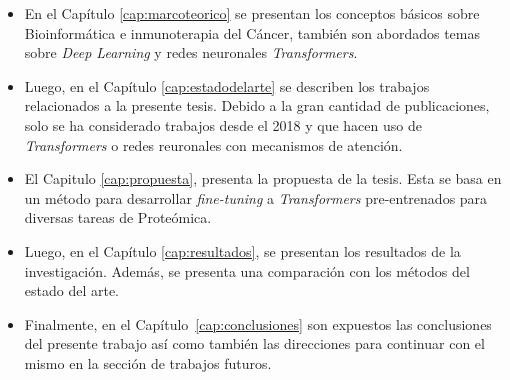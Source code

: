\begin{itemize}
	\item En el Capítulo \ref{cap:marcoteorico} se presentan los conceptos básicos sobre Bioinformática e inmunoterapia del Cáncer, también son abordados temas sobre \textit{Deep Learning} y redes neuronales \textit{Transformers}.
	
	\item Luego, en el Capítulo \ref{cap:estadodelarte} se describen los trabajos relacionados a la presente tesis. Debido a la gran cantidad de publicaciones, solo se ha considerado trabajos desde el 2018 y que hacen uso de \textit{Transformers} o redes reuronales con mecanismos de atención.
	
	\item El Capitulo \ref{cap:propuesta}, presenta la propuesta de la tesis. Esta se basa en un método para desarrollar \textit{fine-tuning} a \textit{Transformers} pre-entrenados para diversas tareas de Proteómica. 
	
	\item Luego, en el Capítulo  \ref{cap:resultados}, se presentan los resultados de la investigación. Además, se presenta una comparación con los métodos del estado del arte.
	
	\item Finalmente, en el Capítulo~\ref{cap:conclusiones} son expuestos las conclusiones del presente trabajo así como también las direcciones para continuar con el mismo en la sección de trabajos futuros.
	
	
	
\end{itemize}







